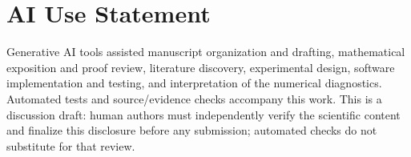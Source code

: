 \documentclass{article}
\theoremstyle{plain}
\theoremstyle{definition}
\theoremstyle{remark}
\begin{document}
\section*{AI Use Statement}

Generative AI tools assisted manuscript organization and drafting, mathematical
exposition and proof review, literature discovery, experimental design,
software implementation and testing, and interpretation of the numerical
diagnostics. Automated tests and source/evidence checks accompany this work.
This is a discussion draft: human authors must independently verify the
scientific content and finalize this disclosure before any submission;
automated checks do not substitute for that review.




\clearpage
\onecolumn
\appendix


\end{document}

